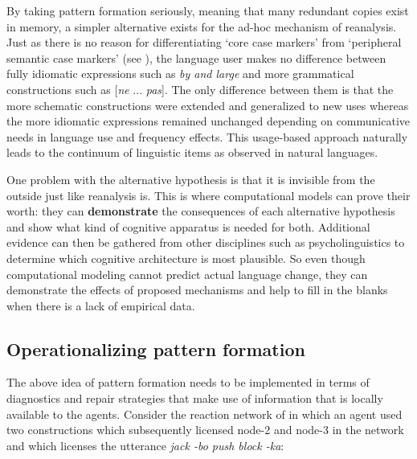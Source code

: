 By taking pattern formation seriously, meaning that many redundant copies exist in memory, a simpler alternative exists for the ad-hoc mechanism of reanalysis. Just as there is no reason for differentiating `core case markers' from `peripheral semantic case markers' (see ), the language user makes no difference between fully idiomatic expressions such as {\em by and large} and more grammatical constructions such as [{\em ne} ... {\em pas}]. The only difference between them is that the more schematic constructions were extended and generalized to new uses whereas the more idiomatic expressions remained unchanged depending on communicative needs in language use and frequency effects. This usage-based approach naturally leads to the continuum of linguistic items as observed in natural languages.

One problem with the alternative hypothesis is that it is invisible from the outside just like reanalysis is. This is where computational models can prove their worth: they can {\bfseries demonstrate} the consequences of each alternative hypothesis and show what kind of cognitive apparatus is needed for both. Additional evidence can then be gathered from other disciplines such as psycholinguistics to determine which cognitive architecture is most plausible. So even though computational modeling cannot predict actual language change, they can demonstrate the effects of proposed mechanisms and help to fill in the blanks when there is a lack of empirical data.

\subsection{Operationalizing pattern formation}
\label{s:operationalizing-patterns}

The above idea of pattern formation needs to be implemented in terms of diagnostics and repair strategies that make use of information that is locally available to the agents. Consider the reaction network of  in which an agent used two constructions which subsequently licensed node-2 and node-3 in the network and which licenses the utterance {\em jack -bo push block -ka}:

